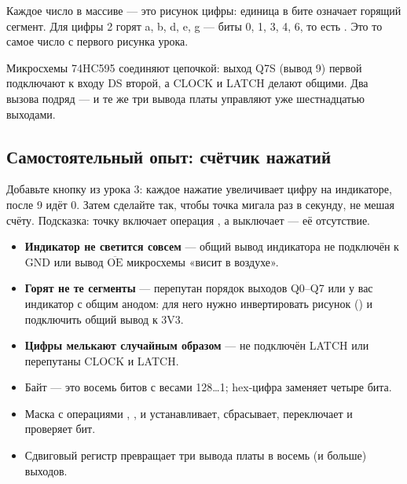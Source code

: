 Каждое число в массиве  --- это рисунок цифры: единица в бите означает горящий сегмент.
Для цифры 2 горят a, b, d, e, g --- биты 0, 1, 3, 4, 6, то есть . Это то самое число
с первого рисунка урока.

\begin{tip}
Микросхемы 74HC595 соединяют цепочкой: выход Q7S (вывод 9) первой подключают к входу DS второй, а CLOCK
и LATCH делают общими. Два вызова  подряд --- и те же три вывода платы управляют уже
шестнадцатью выходами.
\end{tip}

\subsection{Самостоятельный опыт: счётчик нажатий}

Добавьте кнопку из урока 3: каждое нажатие увеличивает цифру на индикаторе, после 9 идёт 0. Затем
сделайте так, чтобы точка мигала раз в секунду, не мешая счёту. Подсказка: точку включает операция
, а выключает --- её отсутствие.

\begin{trouble}
\begin{itemize}[leftmargin=*]
  \item \textbf{Индикатор не светится совсем} --- общий вывод индикатора не подключён к GND или вывод
        $\overline{\text{OE}}$ микросхемы «висит в воздухе».
  \item \textbf{Горят не те сегменты} --- перепутан порядок выходов Q0--Q7 или у вас индикатор с общим
        анодом: для него нужно инвертировать рисунок () и подключить общий вывод к 3V3.
  \item \textbf{Цифры мелькают случайным образом} --- не подключён LATCH или перепутаны CLOCK и LATCH.
\end{itemize}
\end{trouble}

\begin{summary}
\begin{itemize}[leftmargin=*]
  \item Байт --- это восемь битов с весами 128\ldots1; hex-цифра заменяет четыре бита.
  \item Маска  с операциями \code{|=}, \code{\&=\,\textasciitilde}, \code{\textasciicircum=} и \code{\&} устанавливает, сбрасывает, переключает и проверяет бит.
  \item Сдвиговый регистр превращает три вывода платы в восемь (и больше) выходов.
\end{itemize}
\end{summary}

